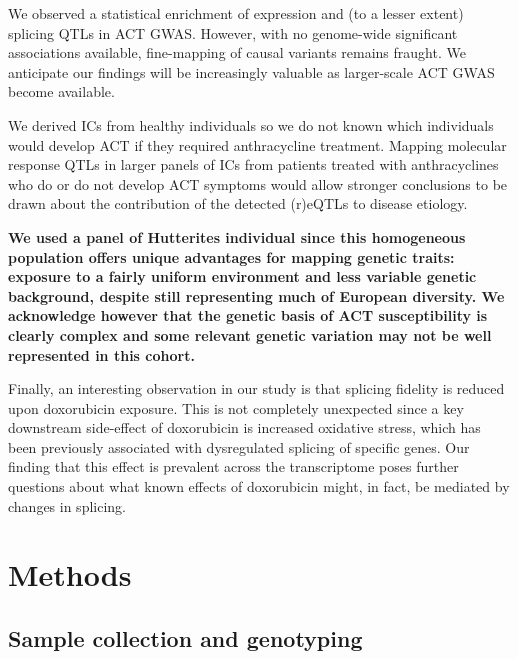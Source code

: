 \documentclass{article}
\newcommand{\tempbold}[1]{\textbf{#1}}
\begin{document}
We observed a statistical enrichment of expression and (to a lesser extent) splicing QTLs in ACT GWAS. However, with no genome-wide significant associations available, fine-mapping of causal variants remains fraught. We anticipate our findings will be increasingly valuable as larger-scale ACT GWAS become available. 

We derived ICs from healthy individuals so we do not known which individuals would develop ACT if they required anthracycline treatment. Mapping molecular response QTLs in larger panels of ICs from patients treated with anthracyclines who do or do not develop ACT symptoms would allow stronger conclusions to be drawn about the contribution of the detected (r)eQTLs to disease etiology. 

\tempbold{We used a panel of Hutterites individual since this homogeneous population offers unique advantages for mapping genetic traits: exposure to a fairly uniform environment and less variable genetic background, despite still representing much of European diversity\cite{Newman2004-ms}. We acknowledge however that the genetic basis of ACT susceptibility is clearly complex and some relevant genetic variation may not be well represented in this cohort.}

Finally, an interesting observation in our study is that splicing fidelity is reduced upon doxorubicin exposure. This is not completely unexpected since a key downstream side-effect of doxorubicin is increased oxidative stress, which has been previously associated with dysregulated splicing of specific genes\cite{Disher2007,Seo2016}. Our finding that this effect is prevalent across the transcriptome poses further questions about what known effects of  doxorubicin might, in fact, be mediated by changes in splicing. 


\section*{Methods} 

\subsection*{Sample collection and genotyping}
\end{document}
